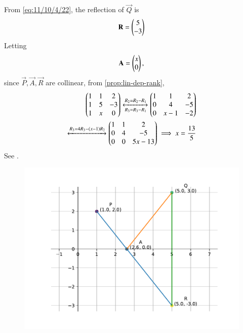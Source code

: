 	From \eqref{eq:11/10/4/22},
the reflection of $\vec{Q}$ is 
\begin{align}
\mathbf{R}  
= \begin{pmatrix}5\\-3\end{pmatrix}
\end{align}
Letting
\begin{align}
\mathbf{A} = \begin{pmatrix}x\\0\end{pmatrix},
\end{align}
since 
$\vec{P},
\vec{A},  
\vec{R}  
$
are collinear, 
		from \eqref{prop:lin-dep-rank},
\begin{align}
	\begin{pmatrix}
		1 & 1 & 2 
		\\ 
		1 & 5 & -3 
		\\
		1 & x & 0 \end{pmatrix}
	\xleftrightarrow[R_3=R_3 - R_1]{R_2 = R_2 - R_1}
	\begin{pmatrix}
		1 & 1 & 2 
		\\ 
		0 & 4 & -5 
		\\
		0 & x-1 & -2 \end{pmatrix}
	\\
	\xleftrightarrow[]{R_3 = 4R_3 - \ensuremath{\left(x-1\right)}R_2}
	\begin{pmatrix}
		1 & 1 & 2 
		\\ 
		0 & 4 & -5 
		\\
		0 & 0 & 5x-13 \end{pmatrix}
	\implies x = \frac{13}{5}
\end{align}
See  
.
\begin{figure}[H]
\centering
\includegraphics[width=0.75\columnwidth]{chapters/11/10/4/22/figs/fig.pdf}
\caption{}
\label{fig:chapters/11/10/4/22/1}
\end{figure}




